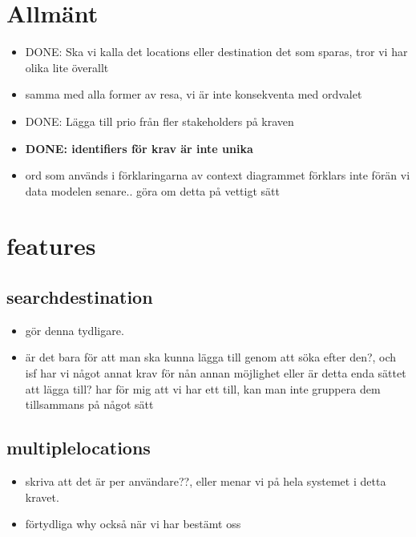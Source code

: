 \documentclass[a4paper]{article}
\begin{document}
	\thispagestyle{empty}
	\setcounter{page}{0}
	\pagebreak
	\tableofcontents
	\pagebreak

\section{Allmänt}
\begin{itemize}

	\item DONE: Ska vi kalla det locations eller destination det som sparas, tror vi har olika lite överallt
	\item samma med alla former av resa, vi är inte konsekventa med ordvalet
	\item DONE: Lägga till prio från fler stakeholders på kraven
	\item \textbf{DONE: identifiers för krav är inte unika}
	\item ord som används i förklaringarna av context diagrammet förklars inte förän vi data modelen senare.. göra om detta på vettigt sätt
\end{itemize}


\section{features}
	\subsection{searchdestination}
		\begin{itemize}
			\item gör denna tydligare. 
			\item är det bara för att man ska kunna lägga till genom att söka efter den?, och isf har vi något annat krav för nån annan möjlighet eller är detta enda sättet att lägga till? har för mig att vi har ett till, kan man inte gruppera dem tillsammans på något sätt
		\end{itemize}
		
	\subsection{multiplelocations}
		\begin{itemize}
			\item skriva att det är per användare??, eller menar vi på hela systemet i detta kravet. 
			\item förtydliga why också när vi har bestämt oss
		\end{itemize}
		
\end{document}
